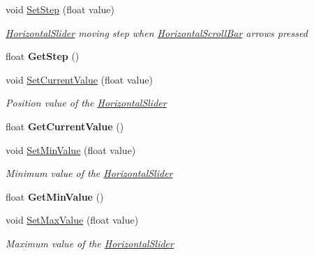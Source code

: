 \begin{DoxyCompactItemize}
\item 
void \mbox{\hyperlink{class_space_v_i_l_1_1_horizontal_slider_a18ffac2f0c6f4f01725b4fd3778dc388}{Set\+Step}} (float value)
\begin{DoxyCompactList}\small\item\em \mbox{\hyperlink{class_space_v_i_l_1_1_horizontal_slider}{Horizontal\+Slider}} moving step when \mbox{\hyperlink{class_space_v_i_l_1_1_horizontal_scroll_bar}{Horizontal\+Scroll\+Bar}} arrows pressed \end{DoxyCompactList}\item 
\mbox{\label{class_space_v_i_l_1_1_horizontal_slider_a42f6f790f49ae171666d30f82908705e}} 
float {\bfseries Get\+Step} ()
\item 
void \mbox{\hyperlink{class_space_v_i_l_1_1_horizontal_slider_a739410ddc3a5391b3ead36097cf2a760}{Set\+Current\+Value}} (float value)
\begin{DoxyCompactList}\small\item\em Position value of the \mbox{\hyperlink{class_space_v_i_l_1_1_horizontal_slider}{Horizontal\+Slider}} \end{DoxyCompactList}\item 
\mbox{\label{class_space_v_i_l_1_1_horizontal_slider_ae9f6753351505d659b8d5ff6c5dff21c}} 
float {\bfseries Get\+Current\+Value} ()
\item 
void \mbox{\hyperlink{class_space_v_i_l_1_1_horizontal_slider_aba8cd3fc86a3b670f03badbdd0a28b8c}{Set\+Min\+Value}} (float value)
\begin{DoxyCompactList}\small\item\em Minimum value of the \mbox{\hyperlink{class_space_v_i_l_1_1_horizontal_slider}{Horizontal\+Slider}} \end{DoxyCompactList}\item 
\mbox{\label{class_space_v_i_l_1_1_horizontal_slider_acaa2423ec23d142c67ebeb26a78b0479}} 
float {\bfseries Get\+Min\+Value} ()
\item 
void \mbox{\hyperlink{class_space_v_i_l_1_1_horizontal_slider_a371d41e7d45c1d027a7d1a94209e4ecb}{Set\+Max\+Value}} (float value)
\begin{DoxyCompactList}\small\item\em Maximum value of the \mbox{\hyperlink{class_space_v_i_l_1_1_horizontal_slider}{Horizontal\+Slider}} \end{DoxyCompactList}\item 

\end{DoxyCompactItemize}
